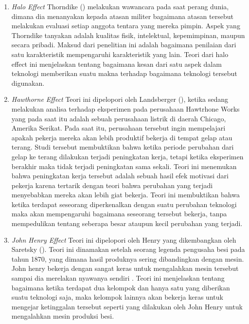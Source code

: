 	\begin{enumerate}
		\item \textit{Halo Effect}
			\subitem Thorndike (\citeyear{paper.thorndike}) melakukan wawancara pada saat perang dunia, dimana dia menanyakan kepada atasan militer bagaimana atasan tersebut melakukan evaluasi setiap anggota tentara yang mereka pimpin. Aspek yang Thorndike tanyakan adalah kualitas fisik, intelektual, kepemimpinan, maupun secara pribadi. Maksud dari penelitian ini adalah bagaimana penilaian dari satu karakteristik mempengaruhi karakteristik yang lain. Teori dari halo effect ini menjelaskan tentang bagaimana kesan dari satu aspek dalam teknologi memberikan suatu makna terhadap bagaimana teknologi tersebut digunakan.
		\item \textit{Hawthorne Effect}
			\subitem Teori ini dipelopori oleh Landsberger (\citeyear{paper.landsberger}), ketika sedang melakukan analisa terhadap eksperimen pada perusahaan Hawtrhone Works yang pada saat itu adalah sebuah perusahaan listrik di daerah Chicago, Amerika Serikat. Pada saat itu, perusahaan tersebut ingin mempelajari apakah pekerja mereka akan lebih produktif bekerja di tempat gelap atau terang. Studi tersebut membuktikan bahwa ketika periode perubahan dari gelap ke terang dilakukan terjadi peningkatan kerja, tetapi ketika eksperimen berakhir maka tidak terjadi peningkatan sama sekali. Teori ini menemukan bahwa peningkatan kerja tersebut adalah sebuah hasil efek motivasi dari pekerja karena tertarik dengan teori bahwa perubahan yang terjadi menyebabkan mereka akan lebih giat bekerja. Teori ini membuktikan bahwa ketika terdapat seseorang diperkenalkan dengan suatu perubahan teknologi maka akan mempengaruhi bagaimana seseorang tersebut bekerja, tanpa mempedulikan tentang seberapa besar ataupun kecil perubahan yang terjadi.
		\item \textit{John Henry Effect}
			\subitem Teori ini dipelopori oleh Henry yang dikembangkan oleh Saretsky (\citeyear{paper.Saretsky}). Teori ini dinamakan setelah seorang legenda pengusaha besi pada tahun 1870, yang dimana hasil produknya sering dibandingkan dengan mesin. John henry bekerja dengan sangat keras untuk mengalahkan mesin tersebut sampai dia merelakan nyawanya sendiri . Teori ini menjelaskan tentang bagaimana ketika terdapat dua kelompok dan hanya satu yang diberikan suatu teknologi saja, maka kelompok lainnya akan bekerja keras untuk mengejar ketinggalan tersebut seperti yang dilakukan oleh John Henry untuk mengalahkan mesin produksi besi.
	\end{enumerate}

